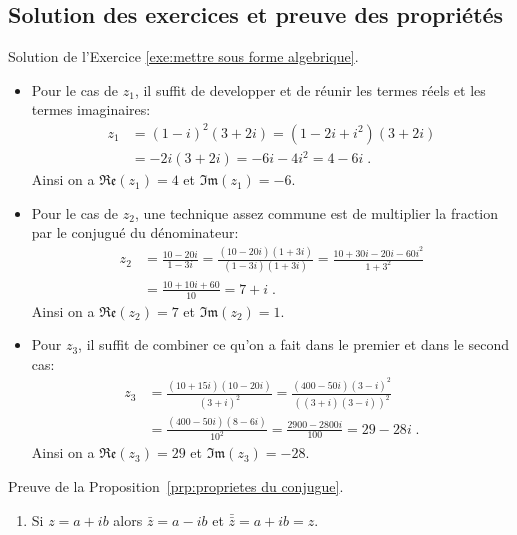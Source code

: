 \begin{corrige}

\section{Solution des exercices et preuve des propri\'et\'es}
\begin{sol}
Solution de l'Exercice \ref{exe:mettre sous forme algebrique}. 
\begin{itemize}
	\item Pour le cas de $z_1$, il suffit de developper et de r\'eunir les termes r\'eels et les termes imaginaires: 
		\begin{align*}
		      z_1 & = (1-i)^2 (3+2i) = (1-2i+i^2) (3+2i)  \\
		          & = -2i (3+2i) = -6i - 4i^2 = 4 - 6i \;.
		\end{align*} 
		Ainsi on a $\mathfrak{Re}(z_1) = 4$ et $\mathfrak{Im}(z_1) = -6$.
	\item Pour le cas de $z_2$, une technique assez commune est de multiplier la fraction par le conjugu\'e du d\'enominateur: 
		\begin{align*}
		      z_2 & = \frac{10-20i}{1-3i} = \frac{(10 - 20 i) (1 + 3i)}{(1-3i) (1+3i)} 
		            = \frac{10 + 30i - 20i - 60 i^2}{1 + 3^2} \\
		          & = \frac{10 + 10 i + 60}{10} = 7 + i \;.
		\end{align*}
		Ainsi on a $\mathfrak{Re}(z_2) = 7$ et $\mathfrak{Im}(z_2) = 1$.
	\item Pour $z_3$, il suffit de combiner ce qu'on a fait dans le premier et dans le second cas:
		\begin{align*}
		      z_3 & = \frac{(10+15i)(10-20i)}{(3+i)^2} = \frac{(400-50i)(3-i)^2}{((3+i)(3-i))^2} \\
		          & = \frac{(400-50i)(8-6i)}{10^2} = \frac{2900 - 2800 i}{100} 
		            = 29 - 28 i \; . 
		\end{align*}
		Ainsi on a $\mathfrak{Re}(z_3) = 29$ et $\mathfrak{Im}(z_3) = -28$.
\end{itemize}
\label{sol:mettre sous forme algebrique}
\end{sol}
\begin{dem}
      \label{dem:proprietes du conjugue}
      Preuve de la Proposition~\ref{prp:proprietes du conjugue}. 
      \begin{enumerate}
            \item Si $z = a + i b$ alors $\bar{z} = a - i b$ et $\bar{\bar{z}} = a + i b = z$.

\end{enumerate}
\end{dem}
\end{corrige}
